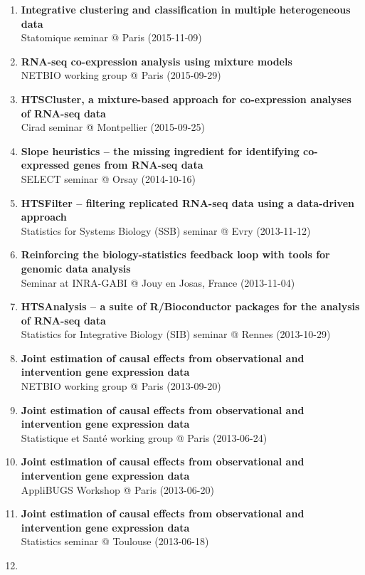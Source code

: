 \documentclass[11pt, a4paper]{awesome-cv}
\begin{document}
\begin{enumerate}
\item
  \textbf{Integrative clustering and classification in multiple
  heterogeneous data}\\
  Statomique seminar @ Paris (2015-11-09)
\item
  \textbf{RNA-seq co-expression analysis using mixture models}\\
  NETBIO working group @ Paris (2015-09-29)
\item
  \textbf{HTSCluster, a mixture-based approach for co-expression
  analyses of RNA-seq data}\\
  Cirad seminar @ Montpellier (2015-09-25)
\item
  \textbf{Slope heuristics -- the missing ingredient for identifying
  co-expressed genes from RNA-seq data}\\
  SELECT seminar @ Orsay (2014-10-16)
\item
  \textbf{HTSFilter -- filtering replicated RNA-seq data using a
  data-driven approach}\\
  Statistics for Systems Biology (SSB) seminar @ Evry (2013-11-12)
\item
  \textbf{Reinforcing the biology-statistics feedback loop with tools
  for genomic data analysis}\\
  Seminar at INRA-GABI @ Jouy en Josas, France (2013-11-04)
\item
  \textbf{HTSAnalysis -- a suite of R/Bioconductor packages for the
  analysis of RNA-seq data}\\
  Statistics for Integrative Biology (SIB) seminar @ Rennes (2013-10-29)
\item
  \textbf{Joint estimation of causal effects from observational and
  intervention gene expression data}\\
  NETBIO working group @ Paris (2013-09-20)
\item
  \textbf{Joint estimation of causal effects from observational and
  intervention gene expression data}\\
  Statistique et Santé working group @ Paris (2013-06-24)
\item
  \textbf{Joint estimation of causal effects from observational and
  intervention gene expression data}\\
  AppliBUGS Workshop @ Paris (2013-06-20)
\item
  \textbf{Joint estimation of causal effects from observational and
  intervention gene expression data}\\
  Statistics seminar @ Toulouse (2013-06-18)
\item

\end{enumerate}
\end{document}
